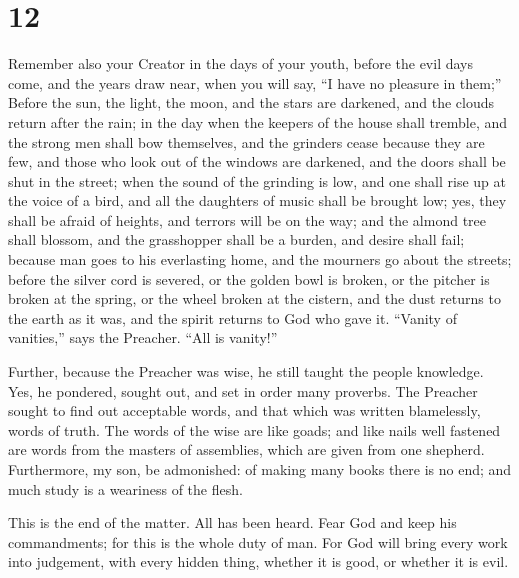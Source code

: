 \hypertarget{section-11}{%
\section{12}\label{section-11}}

 Remember also your Creator in the days of your youth,
before the evil days come, and the years draw near, when you will say,
``I have no pleasure in them;''  Before the sun, the light,
the moon, and the stars are darkened, and the clouds return after the
rain;  in the day when the keepers of the house shall
tremble, and the strong men shall bow themselves, and the grinders cease
because they are few, and those who look out of the windows are
darkened,  and the doors shall be shut in the street; when
the sound of the grinding is low, and one shall rise up at the voice of
a bird, and all the daughters of music shall be brought low;
 yes, they shall be afraid of heights, and terrors will be
on the way; and the almond tree shall blossom, and the grasshopper shall
be a burden, and desire shall fail; because man goes to his everlasting
home, and the mourners go about the streets;  before the
silver cord is severed, or the golden bowl is broken, or the pitcher is
broken at the spring, or the wheel broken at the cistern, 
and the dust returns to the earth as it was, and the spirit returns to
God who gave it.  ``Vanity of vanities,'' says the Preacher.
``All is vanity!''

 Further, because the Preacher was wise, he still taught the
people knowledge. Yes, he pondered, sought out, and set in order many
proverbs.  The Preacher sought to find out acceptable
words, and that which was written blamelessly, words of truth.
 The words of the wise are like goads; and like nails well
fastened are words from the masters of assemblies, which are given from
one shepherd.  Furthermore, my son, be admonished: of
making many books there is no end; and much study is a weariness of the
flesh.

 This is the end of the matter. All has been heard. Fear
God and keep his commandments; for this is the whole duty of man.
 For God will bring every work into judgement, with every
hidden thing, whether it is good, or whether it is evil.
